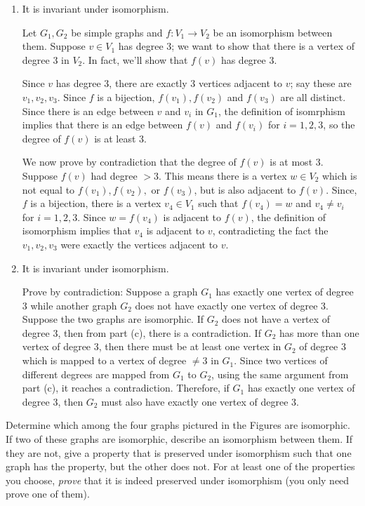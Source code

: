 \documentclass[12pt,twoside]{article}
\begin{document}
\begin{problem}{15}
{\begin{enumerate}
\item
 It is invariant under isomorphism.

Let $G_1, G_2$ be simple graphs and $f:V_1\to V_2$ be an isomorphism
between them.  Suppose $v\in V_1$ has degree 3; we want to show that there
is a vertex of degree 3 in $V_2$.  In fact, we'll show that $f(v)$ has
degree 3.

Since $v$ has degree 3, there are exactly 3 vertices adjacent to $v$; say
these are $v_1,v_2,v_3$.  Since $f$ is a bijection, $f(v_1),f(v_2)$ and
$f(v_3)$ are all distinct.  Since there is an edge between $v$ and $v_i$
in $G_1$, the definition of isomrphism implies that there is an edge
between $f(v)$ and $f(v_i)$ for $i=1,2,3$, so the degree of $f(v)$ is at
least 3.

We now prove by contradiction that the degree of $f(v)$ is at most 3.
Suppose $f(v)$ had degree $>3$.  This means there is a vertex $w \in V_2$
which is not equal to $f(v_1), f(v_2),$ or $f(v_3)$, but is also adjacent
to $f(v)$.  Since, $f$ is a bijection, there is a vertex $v_4 \in V_1$
such that $f(v_4) = w$ and $v_4 \neq v_i$ for $i=1,2,3$.  Since $w=f(v_4)$
is adjacent to $f(v)$, the definition of isomorphism implies that $v_4$ is
adjacent to $v$, contradicting the fact the $v_1,v_2,v_3$ were exactly the
vertices adjacent to $v$.

\item
  It is invariant under isomorphism.

Prove by contradiction:  Suppose a graph $G_1$ has exactly one vertex of
degree $3$ while another graph $G_2$ does not have exactly one vertex of
degree 3. Suppose the two graphs are isomorphic. If $G_2$ does not have
a vertex of degree 3, then from part (c), there is a contradiction.
If $G_2$ has more than one vertex of degree 3, then there must
be at least one vertex in $G_2$ of degree 3 which is mapped to
a vertex of degree $\neq 3$ in $G_1$. Since two vertices of different degrees
are mapped from $G_1$ to $G_2$, using the same argument from part (c),
it reaches a contradiction. Therefore, if $G_1$ has exactly one
vertex of degree 3, then $G_2$ must also have exactly one
vertex of degree 3.

\end{enumerate}

}
 Determine which among the four graphs pictured in the Figures
are isomorphic.  If two of these graphs are isomorphic, describe an
isomorphism between them.  If they are not, give a property that is
preserved under isomorphism such that one graph has the property, but the
other does not.  For at least one of the properties you choose,
\emph{prove} that it is indeed preserved under isomorphism (you only need
prove one of them).


\end{problem}
\end{document}
